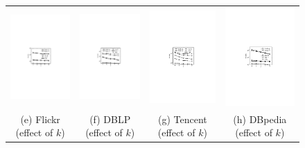 \begin{figure}[htp]
\begin{tabular}{c c c c}
  \begin{minipage}{3.725cm}
	\includegraphics[width=3.725cm]{figures/flickr-k}
  \end{minipage}
  &
  \begin{minipage}{3.725cm}
	\includegraphics[width=3.725cm]{figures/dblp-k}
  \end{minipage}
  &
  \begin{minipage}{3.725cm}
	\includegraphics[width=3.725cm]{figures/tencent-k}
  \end{minipage}
  &
  \begin{minipage}{3.725cm}
	\includegraphics[width=3.725cm]{figures/dbpedia-k}
  \end{minipage}
  \\
  \small (e) Flickr (effect of $k$)
  &
  \small (f) DBLP (effect of $k$)
  &
  \small (g) Tencent (effect of $k$)
  &
  \small (h) DBpedia (effect of $k$)
  \\


\end{tabular}
\end{figure}
